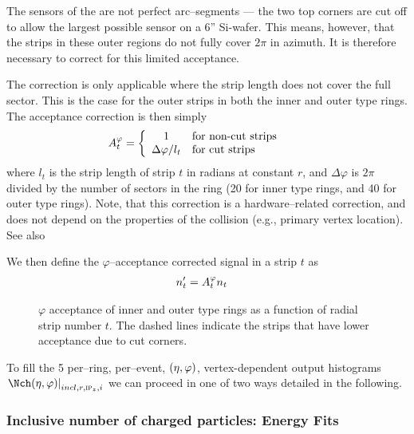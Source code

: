 The sensors of the \FMD{} are not perfect arc--segments
\cite{cholm:2009} --- the two top corners are cut off to allow the
largest possible sensor on a 6'' Si-wafer.  This means, however, that
the strips in these outer regions do not fully cover $2\pi$ in
azimuth. It is therefore necessary to correct for this limited
acceptance.

The correction is only applicable where the strip length does not
cover the full sector.  This is the case for the outer strips in both
the inner and outer type rings.  The acceptance correction is then
simply
\begin{align}
  \label{eq:acc_corr}
  A^{\varphi}_{t}{} &=
     \left\{
       \begin{array}{cl}
         1 & \text{for non-cut strips}\\
         \Delta\varphi/l_t & \text{for cut strips}\\
       \end{array}\right.
     \quad
\end{align}
where $l_t$ is the strip length of strip $t$ in radians at constant
$r$, and $\Delta\varphi$ is $2\pi$ divided by the number of sectors in
the ring (20 for inner type rings, and 40 for outer type rings). Note,
that this correction is a hardware--related correction, and does not
depend on the properties of the collision (e.g., primary vertex
location).  See also 

We then define the $\varphi$--acceptance corrected signal in a strip
$t$ as 
\begin{align}
  n'_t &= A^{\varphi}_{t}{} n_t
\end{align}

\begin{figure}[htbp]
  \centering
  \caption{$\varphi$ acceptance of inner and outer type rings as a
    function of radial strip number $t$. The dashed lines indicate the
    strips that have lower acceptance due to cut corners.}
  \label{fig:density:corners}
\end{figure}

To fill the 5 per--ring, per--event, $(\eta,\varphi)$, vertex-dependent
output histograms $\dndetadphi[incl,r,\subIPz,i]$ we can proceed in
one of two ways detailed in the following.

\subsubsection{Inclusive number of charged particles: Energy Fits} 
\label{sec:sub:sub:eloss_fits}

